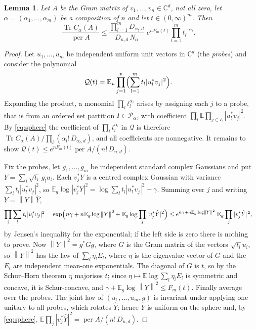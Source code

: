 \documentclass[11pt,a4paper]{article}
\newtheorem{lemma}[theorem]{Lemma}
\theoremstyle{remark}
\newcommand{\per}{\operatorname{per}}
\newcommand{\Tr}{\operatorname{Tr}}
\newcommand{\norm}[1]{\left\lVert#1\right\rVert}
\newcommand{\C}{\mathbb C}
\newcommand{\E}{\mathbb E}
\begin{document}
\begin{lemma}\label{lem:trace}
Let $A$ be the Gram matrix of $v_1,\dots,v_n\in\C^d$, not all zero, let $\alpha=(\alpha_1,\dots,\alpha_m)$ be a composition of $n$ and let $t\in(0,\infty)^m$. Then
\[
 \frac{\Tr C_\alpha(A)}{\per A}\le
 \frac{\prod_{l=1}^mD_{\alpha_l,d}}{D_{n,d}\,N_\alpha}\;e^{nF_m(t)}\prod_{l=1}^mt_l^{-\alpha_l}.
\]
\end{lemma}
\begin{proof}
Let $u_1,\dots,u_m$ be independent uniform unit vectors in $\C^d$ (the \emph{probes}) and consider the polynomial
\[
 \mathcal Q(t)=\E_{u}\prod_{j=1}^n\Bigl(\sum_{l=1}^mt_l|u_l^*v_j|^2\Bigr).
\]
Expanding the product, a monomial $\prod_lt_l^{\alpha_l}$ arises by assigning each $j$ to a probe, that is from an ordered set partition $I\in\mathcal P_\alpha$, with coefficient $\prod_l\E\prod_{j\in I_l}|u_l^*v_j|^2$. By \eqref{eq:sphere} the coefficient of $\prod_lt_l^{\alpha_l}$ in $\mathcal Q$ is therefore $\Tr C_\alpha(A)/\prod_l(\alpha_l!\,D_{\alpha_l,d})$, and all coefficients are nonnegative. It remains to show $\mathcal Q(t)\le e^{nF_m(t)}\per A/(n!\,D_{n,d})$.

Fix the probes, let $g_1,\dots,g_m$ be independent standard complex Gaussians and put $Y=\sum_l\sqrt{t_l}\,g_lu_l$. Each $v_j^*Y$ is a centred complex Gaussian with variance $\sum_lt_l|u_l^*v_j|^2$, so $\E_g\log|v_j^*Y|^2=\log\sum_lt_l|u_l^*v_j|^2-\gamma$. Summing over $j$ and writing $Y=\norm Y\hat Y$,
\[
 \prod_j\sum_lt_l|u_l^*v_j|^2
 =\exp\Bigl(n\gamma+n\E_g\log\norm Y^2+\E_g\log\prod_j|v_j^*\hat Y|^2\Bigr)
 \le e^{n\gamma+n\E_g\log\norm Y^2}\;\E_g\prod_j|v_j^*\hat Y|^2,
\]
by Jensen's inequality for the exponential; if the left side is zero there is nothing to prove. Now $\norm Y^2=g^*Gg$, where $G$ is the Gram matrix of the vectors $\sqrt{t_l}u_l$, so $\norm Y^2$ has the law of $\sum_l\eta_lE_l$, where $\eta$ is the eigenvalue vector of $G$ and the $E_l$ are independent mean-one exponentials. The diagonal of $G$ is $t$, so by the Schur--Horn theorem $\eta$ majorises $t$; since $\eta\mapsto\E\log\sum_l\eta_lE_l$ is symmetric and concave, it is Schur-concave, and $\gamma+\E_g\log\norm Y^2\le F_m(t)$. Finally average over the probes. The joint law of $(u_1,\dots,u_m,g)$ is invariant under applying one unitary to all probes, which rotates $\hat Y$; hence $\hat Y$ is uniform on the sphere and, by \eqref{eq:sphere}, $\E\prod_j|v_j^*\hat Y|^2=\per A/(n!\,D_{n,d})$.
\end{proof}
\end{document}
